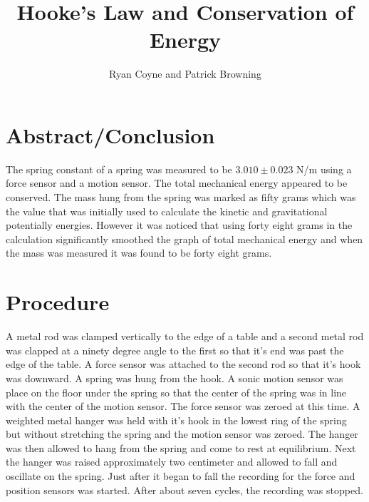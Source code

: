 \documentclass[12pt]{article}
\begin{document}
    \title{Hooke's Law and Conservation of Energy}
    \author{Ryan Coyne and Patrick Browning}
    \maketitle
    \section{Abstract/Conclusion}
        The spring constant of a spring was measured to be \(3.010 \pm 0.023\) N/m using a force sensor and a motion sensor. The total mechanical energy appeared to be conserved. The mass hung from the spring was marked as fifty grams which was the value that was initially used to calculate the kinetic and gravitational potentially energies. However it was noticed that using forty eight grams in the calculation significantly smoothed the graph of total mechanical energy and when the mass was measured it was found to be forty eight grams.
    \section{Procedure}
        A metal rod was clamped vertically to the edge of a table and a second metal rod was clapped at a ninety degree angle to the first so that it's end was past the edge of the table. A force sensor was attached to the second rod so that it's hook was downward. A spring was hung from the hook. A sonic motion sensor was place on the floor under the spring so that the center of the spring was in line with the center of the motion sensor. The force sensor was zeroed at this time. A weighted metal hanger was held with it's hook in the lowest ring of the spring but without stretching the spring and the motion sensor was zeroed. The hanger was then allowed to hang from the spring and come to rest at equilibrium. Next the hanger was raised approximately two centimeter and allowed to fall and oscillate on the spring. Just after it began to fall the recording for the force and position sensors was started. After about seven cycles, the recording was stopped.
\end{document}
